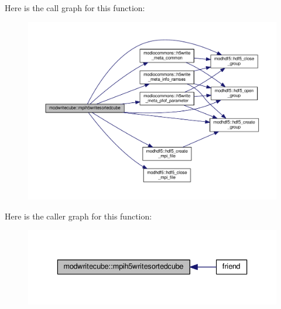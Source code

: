 Here is the call graph for this function\+:\nopagebreak
\begin{figure}[H]
\begin{center}
\leavevmode
\includegraphics[width=350pt]{namespacemodwritecube_a491b7602123b1ac2d10637eb7c73ce77_cgraph}
\end{center}
\end{figure}




Here is the caller graph for this function\+:\nopagebreak
\begin{figure}[H]
\begin{center}
\leavevmode
\includegraphics[width=336pt]{namespacemodwritecube_a491b7602123b1ac2d10637eb7c73ce77_icgraph}
\end{center}
\end{figure}


